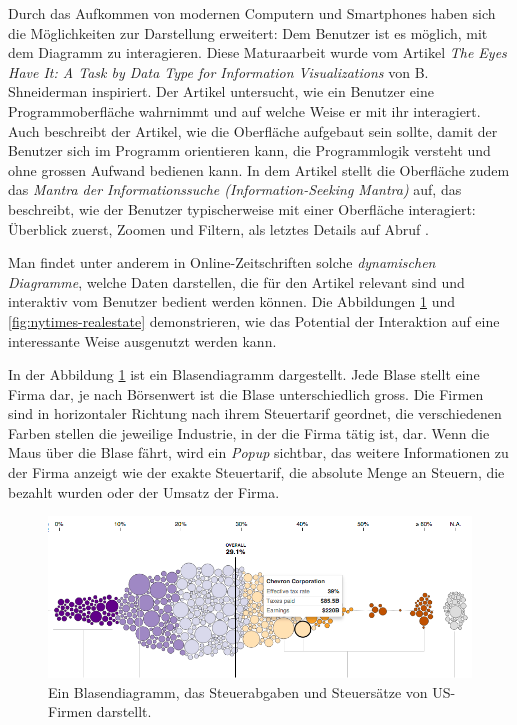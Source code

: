 Durch das Aufkommen von modernen Computern und Smartphones haben sich die Möglichkeiten zur Darstellung erweitert: Dem Benutzer ist es möglich, mit dem Diagramm zu interagieren. Diese Maturaarbeit wurde vom Artikel \textit{The Eyes Have It: A Task by Data Type for Information Visualizations} von B. Shneiderman \cite{shneiderman} inspiriert. Der Artikel untersucht, wie ein Benutzer eine Programmoberfläche wahrnimmt und auf welche Weise er mit ihr interagiert. Auch beschreibt der Artikel, wie die Oberfläche aufgebaut sein sollte, damit der Benutzer sich im Programm orientieren kann, die Programmlogik versteht und ohne grossen Aufwand bedienen kann. In dem Artikel stellt die Oberfläche zudem das \textit{Mantra der Informationssuche (Information-Seeking Mantra)} auf, das beschreibt, wie der Benutzer typischerweise mit einer Oberfläche interagiert: Überblick zuerst, Zoomen und Filtern, als letztes Details auf Abruf \cite{shneiderman}.

Man findet unter anderem in Online-Zeitschriften solche \textit{dynamischen Diagramme}, welche Daten darstellen, die für den Artikel relevant sind und interaktiv vom Benutzer bedient werden können. Die Abbildungen \ref{fig:nytimes-taxes} und \ref{fig:nytimes-realestate} demonstrieren, wie das Potential der Interaktion auf eine interessante Weise ausgenutzt werden kann.

In der Abbildung \ref{fig:nytimes-taxes} ist ein Blasendiagramm dargestellt. Jede Blase stellt eine Firma dar, je nach Börsenwert ist die Blase unterschiedlich gross. Die Firmen sind in horizontaler Richtung nach ihrem Steuertarif geordnet, die verschiedenen Farben stellen die jeweilige Industrie, in der die Firma tätig ist, dar. Wenn die Maus über die Blase fährt, wird ein \textit{Popup} sichtbar, das weitere Informationen zu der Firma anzeigt wie der exakte Steuertarif, die absolute Menge an Steuern, die bezahlt wurden oder der Umsatz der Firma.

\begin{figure}[!htbp]
	\centering
	\includegraphics[width=\linewidth]{images/nytimes-taxes-zugeschnitten}
	\caption[Blasendiagramm in The New York Times]{Ein Blasendiagramm, das Steuerabgaben und Steuersätze von US-Firmen darstellt. \cite{nytimes-taxes}}
	\label{fig:nytimes-taxes}
\end{figure}

